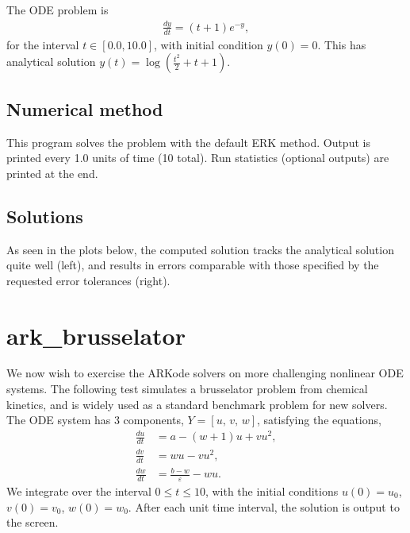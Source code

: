 \documentclass[letterpaper,10pt,english]{sphinxmanual}
\begin{document}
The ODE problem is
\begin{equation*}
\begin{split}\frac{dy}{dt} = (t+1) e^{-y},\end{split}
\end{equation*}
for the interval \(t \in [0.0, 10.0]\), with initial condition
\(y(0)=0\).  This has analytical solution \(y(t) =
\log\left(\frac{t^2}{2} + t + 1\right)\).


\subsection{Numerical method}
\label{\detokenize{c_serial:id3}}
This program solves the problem with the default ERK method.  Output
is printed every 1.0 units of time (10 total).
Run statistics (optional outputs) are printed at the end.


\subsection{Solutions}
\label{\detokenize{c_serial:id4}}
As seen in the plots below, the computed solution tracks the
analytical solution quite well (left), and results in errors
comparable with those specified by the requested error tolerances
(right).

\noindent{}

\noindent{}


\section{ark\_brusselator}
\label{\detokenize{c_serial:ark-brusselator}}\label{\detokenize{c_serial:id5}}
We now wish to exercise the ARKode solvers on more challenging
nonlinear ODE systems.  The following test simulates a brusselator
problem from chemical kinetics, and is widely used as a standard
benchmark problem for new solvers.  The ODE system has 3 components,
\(Y = [u,\, v,\, w]\), satisfying the equations,
\begin{equation*}
\begin{split}\frac{du}{dt} &= a - (w+1)u + v u^2, \\
\frac{dv}{dt} &= w u - v u^2, \\
\frac{dw}{dt} &= \frac{b-w}{\varepsilon} - w u.\end{split}
\end{equation*}
We integrate over the interval \(0 \le t \le 10\), with the
initial conditions \(u(0) = u_0\), \(v(0) = v_0\), \(w(0)
= w_0\). After each unit time interval, the solution is output to the
screen.
\end{document}

